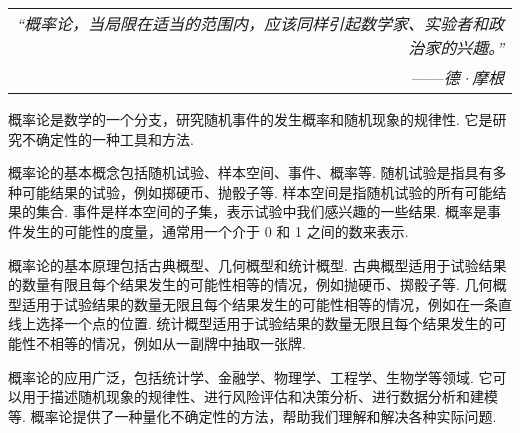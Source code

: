 \begin{flushright}
    \begin{tabular}{r|||}
        \textit{“概率论，当局限在适当的范围内，应该同样引起数学家、实验者和政治家的兴趣。”}\\
        ——\textit{德·摩根}
    \end{tabular}
\end{flushright}

概率论是数学的一个分支，研究随机事件的发生概率和随机现象的规律性. 它是研究不确定性的一种工具和方法. 

概率论的基本概念包括随机试验、样本空间、事件、概率等. 随机试验是指具有多种可能结果的试验，例如掷硬币、抛骰子等. 样本空间是指随机试验的所有可能结果的集合. 事件是样本空间的子集，表示试验中我们感兴趣的一些结果. 概率是事件发生的可能性的度量，通常用一个介于 0 和 1 之间的数来表示. 

概率论的基本原理包括古典概型、几何概型和统计概型. 古典概型适用于试验结果的数量有限且每个结果发生的可能性相等的情况，例如抛硬币、掷骰子等. 几何概型适用于试验结果的数量无限且每个结果发生的可能性相等的情况，例如在一条直线上选择一个点的位置. 统计概型适用于试验结果的数量无限且每个结果发生的可能性不相等的情况，例如从一副牌中抽取一张牌. 

概率论的应用广泛，包括统计学、金融学、物理学、工程学、生物学等领域. 它可以用于描述随机现象的规律性、进行风险评估和决策分析、进行数据分析和建模等. 概率论提供了一种量化不确定性的方法，帮助我们理解和解决各种实际问题. 